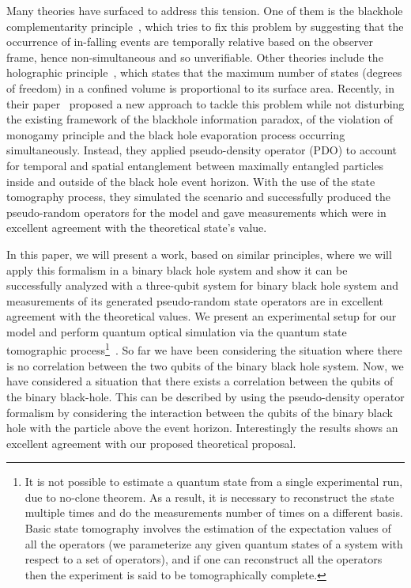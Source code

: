 \documentclass[fleqn,usenatbib]{mnras}
\begin{document}
Many theories have surfaced to address this tension. One of them is the blackhole complementarity principle~\citep{susskind2}, which tries to fix this problem by suggesting that the occurrence of in-falling events are temporally relative based on the observer frame, hence non-simultaneous and so unverifiable. Other theories include the holographic principle~\citep{sus2}, which states that the maximum number of states (degrees of freedom) in a confined volume is proportional to its surface area.  Recently, in their paper~\citep{monogamy} proposed a new approach to tackle this problem while not disturbing the existing framework of the blackhole information paradox, of the violation of monogamy principle and the black hole evaporation process occurring simultaneously. Instead, they applied pseudo-density operator (PDO) to account for temporal and spatial entanglement between maximally entangled particles inside and outside of the black hole event horizon. With the use of the state tomography process, they simulated the scenario and successfully produced the pseudo-random operators for the model and gave measurements which were in excellent agreement with the theoretical state's value. 

In this paper, we will present a work, based on similar principles, where we will apply this formalism in a binary black hole system and show it can be successfully analyzed with a three-qubit system for binary black hole system and measurements of its generated pseudo-random state operators are in excellent agreement with the theoretical values. We present an experimental setup for our model and perform quantum optical simulation via the quantum state tomographic process\footnote{It is not possible to estimate a quantum state from a single experimental run, due to no-clone theorem. As a result, it is necessary to reconstruct the state multiple times and do the measurements number of times on a different basis. Basic state tomography involves the estimation of the expectation values of all the operators (we parameterize any given quantum states of a system with respect to a set of operators), and if one can reconstruct all the operators then the experiment is said to be tomographically complete.}~\citep{tomo}. So far we have been considering the situation where there is no correlation between the two qubits of the binary black hole system.  Now, we have considered a situation that there exists a correlation between the qubits of the binary black-hole. This can be described by using the pseudo-density operator formalism by considering the interaction between the qubits of the binary black hole with the particle above the event horizon. Interestingly the results shows an excellent agreement with our proposed theoretical proposal.
\end{document}

